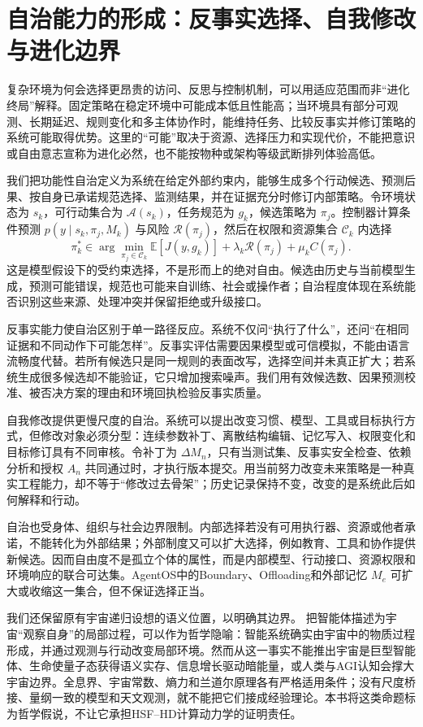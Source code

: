 \section{自治能力的形成：反事实选择、自我修改与进化边界}
复杂环境为何会选择更昂贵的访问、反思与控制机制，可以用适应范围而非“进化终局”解释。固定策略在稳定环境中可能成本低且性能高；当环境具有部分可观测、长期延迟、规则变化和多主体协作时，能维持任务、比较反事实并修订策略的系统可能取得优势。这里的“可能”取决于资源、选择压力和实现代价，不能把意识或自由意志宣称为进化必然，也不能按物种或架构等级武断排列体验高低。

我们把功能性自治定义为系统在给定外部约束内，能够生成多个行动候选、预测后果、按自身已承诺规范选择、监测结果，并在证据充分时修订内部策略。令环境状态为 $s_k$，可行动集合为 $\mathcal A(s_k)$，任务规范为 $g_k$，候选策略为 $\pi_j$。控制器计算条件预测 $p(y\mid s_k,\pi_j,M_k)$ 与风险 $\mathcal R(\pi_j)$，然后在权限和资源集合 $\mathcal C_k$ 内选择
\[
\pi_k^*\in\arg\min_{\pi_j\in\mathcal C_k}
\mathbb E[J(y,g_k)]+\lambda_k\mathcal R(\pi_j)+\mu_k C(\pi_j).
\]
这是模型假设下的受约束选择，不是形而上的绝对自由。候选由历史与当前模型生成，预测可能错误，规范也可能来自训练、社会或操作者；自治程度体现在系统能否识别这些来源、处理冲突并保留拒绝或升级接口。

反事实能力使自治区别于单一路径反应。系统不仅问“执行了什么”，还问“在相同证据和不同动作下可能怎样”。反事实评估需要因果模型或可信模拟，不能由语言流畅度代替。若所有候选只是同一规则的表面改写，选择空间并未真正扩大；若系统生成很多候选却不能验证，它只增加搜索噪声。我们用有效候选数、因果预测校准、被否决方案的理由和环境回执检验反事实质量。

自我修改提供更慢尺度的自治。系统可以提出改变习惯、模型、工具或目标执行方式，但修改对象必须分型：连续参数补丁、离散结构编辑、记忆写入、权限变化和目标修订具有不同审核。令补丁为 $\Delta M_n$，只有当测试集、反事实安全检查、依赖分析和授权 $A_n$ 共同通过时，才执行版本提交。用当前努力改变未来策略是一种真实工程能力，却不等于“修改过去骨架”；历史记录保持不变，改变的是系统此后如何解释和行动。

自治也受身体、组织与社会边界限制。内部选择若没有可用执行器、资源或他者承诺，不能转化为外部结果；外部制度又可以扩大选择，例如教育、工具和协作提供新候选。因而自由度不是孤立个体的属性，而是内部模型、行动接口、资源权限和环境响应的联合可达集。AgentOS中的Boundary、Offloading和外部记忆 $M_e$ 可扩大或收缩这一集合，但不保证选择正当。

我们还保留原有宇宙递归设想的语义位置，以明确其边界。
\label{subsec:cosmic_recursion_hypothesis}
把智能体描述为宇宙“观察自身”的局部过程，可以作为哲学隐喻：智能系统确实由宇宙中的物质过程形成，并通过观测与行动改变局部环境。然而从这一事实不能推出宇宙是巨型智能体、生命使量子态获得语义实存、信息增长驱动暗能量，或人类与AGI认知会撑大宇宙边界。全息界、宇宙常数、熵力和兰道尔原理各有严格适用条件；没有尺度桥接、量纲一致的模型和天文观测，就不能把它们接成经验理论。本书将这类命题标为哲学假说，不让它承担HSF--HD计算动力学的证明责任。

